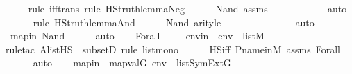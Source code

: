 \begin{isabellebody}
\ \ \ \ \isamarkupfalse%
{\isacharparenleft}{\kern0pt}rule\ iff{\isacharunderscore}{\kern0pt}trans{\isacharcomma}{\kern0pt}\ rule\ HS{\isacharunderscore}{\kern0pt}truth{\isacharunderscore}{\kern0pt}lemma{\isacharunderscore}{\kern0pt}Neg{\isacharparenright}{\kern0pt}\isanewline
\ \ \ \ \isamarkupfalse%
\ Nand\ assms\ \isanewline
\ \ \ \ \ \ \ \ \ \isamarkupfalse%
\ auto{\isacharbrackleft}{\kern0pt}{}{\isacharbrackright}{\kern0pt}\isanewline
\ \ \ \ \ \isamarkupfalse%
{\isacharparenleft}{\kern0pt}rule\ HS{\isacharunderscore}{\kern0pt}truth{\isacharunderscore}{\kern0pt}lemma{\isacharunderscore}{\kern0pt}And{\isacharparenright}{\kern0pt}\isanewline
\ \ \ \ \isamarkupfalse%
\ Nand\ arityle\ \isanewline
\ \ \ \ \ \ \ \ \ \ \ \ \isamarkupfalse%
\ auto{\isacharbrackleft}{\kern0pt}{}{\isacharbrackright}{\kern0pt}\isanewline
\ \ \ \ \isamarkupfalse%
\ mapin\ Nand\isanewline
\ \ \ \ \isamarkupfalse%
\ auto\isanewline
{}\isamarkupfalse%
\isanewline
\ \ \isamarkupfalse%
\ {\isacharparenleft}{\kern0pt}Forall\ {\isasymphi}{\isacharparenright}{\kern0pt}\isanewline
\isanewline
\ \ \isamarkupfalse%
\ envin\ {\isacharcolon}{\kern0pt}\ {\isachardoublequoteopen}env\ {\isasymin}\ list{\isacharparenleft}{\kern0pt}M{\isacharparenright}{\kern0pt}{\isachardoublequoteclose}\ \isanewline
\ \ \ \ \isamarkupfalse%
{\isacharparenleft}{\kern0pt}rule{\isacharunderscore}{\kern0pt}tac\ A{\isacharequal}{\kern0pt}{\isachardoublequoteopen}list{\isacharparenleft}{\kern0pt}HS{\isacharparenright}{\kern0pt}{\isachardoublequoteclose}\ \ subsetD{\isacharcomma}{\kern0pt}\ rule\ list{\isacharunderscore}{\kern0pt}mono{\isacharparenright}{\kern0pt}\isanewline
\ \ \ \ \isamarkupfalse%
\ HS{\isacharunderscore}{\kern0pt}iff\ P{\isacharunderscore}{\kern0pt}name{\isacharunderscore}{\kern0pt}in{\isacharunderscore}{\kern0pt}M\ assms\ Forall\isanewline
\ \ \ \ \isamarkupfalse%
\ auto\isanewline
\ \ \isamarkupfalse%
\ mapin\ {\isacharcolon}{\kern0pt}\ {\isachardoublequoteopen}map{\isacharparenleft}{\kern0pt}val{\isacharparenleft}{\kern0pt}G{\isacharparenright}{\kern0pt}{\isacharcomma}{\kern0pt}\ env{\isacharparenright}{\kern0pt}\ {\isasymin}\ list{\isacharparenleft}{\kern0pt}SymExt{\isacharparenleft}{\kern0pt}G{\isacharparenright}{\kern0pt}{\isacharparenright}{\kern0pt}{\isachardoublequoteclose}\ \isanewline
\ \ \ \ \isamarkupfalse%

\end{isabellebody}
